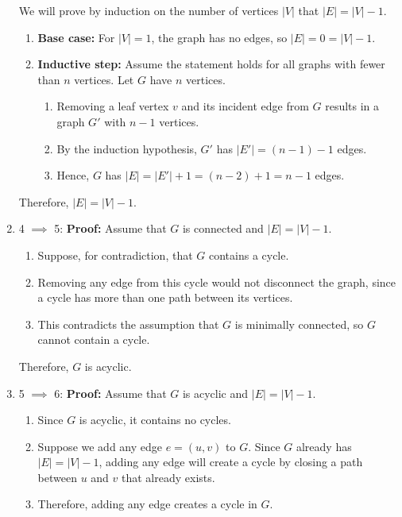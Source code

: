 \begin{derivation}
\begin{enumerate}
            We will prove by induction on the number of vertices \( |V| \) that \( |E| = |V| - 1 \).
            \begin{enumerate}
                \item \textbf{Base case:} For \( |V| = 1 \), the graph has no edges, so \( |E| = 0 = |V| - 1 \).
                \item \textbf{Inductive step:} Assume the statement holds for all graphs with fewer than \( n \) vertices. Let \( G \) have \( n \) vertices.
                \begin{enumerate}
                    \item Removing a leaf vertex \( v \) and its incident edge from \( G \) results in a graph \( G' \) with \( n - 1 \) vertices.
                    \item By the induction hypothesis, \( G' \) has \( |E'| = (n - 1) - 1 \) edges.
                    \item Hence, \( G \) has \( |E| = |E'| + 1 = (n - 2) + 1 = n - 1 \) edges.
                \end{enumerate}
            \end{enumerate}
            Therefore, \( |E| = |V| - 1 \).
        
            \item 4 $\implies$ 5: 
            \textbf{Proof:} Assume that \( G \) is connected and \( |E| = |V| - 1 \).
            \begin{enumerate}
                \item Suppose, for contradiction, that \( G \) contains a cycle.
                \item Removing any edge from this cycle would not disconnect the graph, since a cycle has more than one path between its vertices.
                \item This contradicts the assumption that \( G \) is minimally connected, so \( G \) cannot contain a cycle.
            \end{enumerate}
            Therefore, \( G \) is acyclic.
        
            \item 5 $\implies$ 6:
            \textbf{Proof:} Assume that \( G \) is acyclic and \( |E| = |V| - 1 \).
            \begin{enumerate}
                \item Since \( G \) is acyclic, it contains no cycles.
                \item Suppose we add any edge \( e = (u, v) \) to \( G \). Since \( G \) already has \( |E| = |V| - 1 \), adding any edge will create a cycle by closing a path between \( u \) and \( v \) that already exists.
                \item Therefore, adding any edge creates a cycle in \( G \).
            \end{enumerate}
            

\end{enumerate}
\end{derivation}
